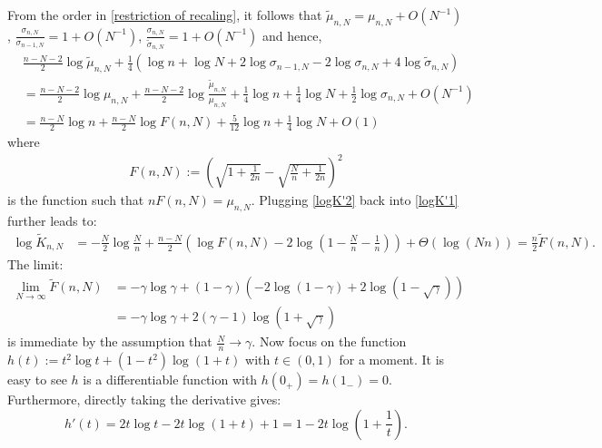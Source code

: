\documentclass[11pt]{article}
\numberwithin{equation}{section}%
\numberwithin{theorem}{section}
\begin{document}
From the order in \eqref{restriction of recaling}, it follows that $\tilde{\mu}_{n,N}=\mu_{n,N}+O(N^{-1})$, $\frac{\sigma_{n,N}}{\sigma_{n-1,N}}=1+O\left(N^{-1}\right)$, $\frac{\sigma_{n,N}}{\tilde\sigma_{n,N}}=1+O\left(N^{-1}\right)$ and hence,
\begin{equation}\label{logK'2}
\begin{split}
        &\frac{n-N-2}{2}\log\tilde{\mu}_{n,N}+\frac{1}{4}\left(\log n+\log N+2\log\sigma_{n-1,N}-2\log\sigma_{n,N}+4\log\tilde{\sigma}_{n,N}\right)\\
        &=\frac{n-N-2}{2}\log \mu_{n,N}+\frac{n-N-2}{2}\log\frac{\tilde{\mu}_{n,N}}{\mu_{n,N}}+\frac{1}{4}\log n+\frac{1}{4}\log N+\frac{1}{2}\log\sigma_{n,N}+O(N^{-1})\\
        &=\frac{n-N}{2}\log n+\frac{n-N}{2}\log F(n,N)+\frac{5}{12}\log n+\frac{1}{4}\log N+O(1)
\end{split}
\end{equation}
where 
\begin{equation*}
    \begin{array}{cc}
       F(n,N):=\left(\sqrt{1+\frac{1}{2n}}-\sqrt{\frac{N}{n}+\frac{1}{2n}}\right)^2
    \end{array}
\end{equation*}
is the function such that $nF(n,N)=\mu_{n,N}$. Plugging \eqref{logK'2} back into \eqref{logK'1} further leads to:
\begin{equation*}
    \begin{split}
     \log\tilde{K}_{n,N}&=-\frac{N}{2}\log\frac{N}{n}+\frac{n-N}{2}\left(\log F(n,N)-2\log\left(1-\frac{N}{n}-\frac{1}{n}\right)\right)+\Theta\left(\log(Nn)\right)=\frac{n}{2}\tilde{F}(n,N).
    \end{split}
\end{equation*}
The limit:
\begin{equation}\label{lim4K}
\begin{split}
  \lim_{N\rightarrow\infty}\tilde{F}(n,N)&=-\gamma\log\gamma+(1-\gamma)\left(-2\log(1-\gamma)+2\log(1-\sqrt\gamma)\right)\\
  &=-\gamma\log\gamma+2(\gamma-1)\log(1+\sqrt\gamma)
  \end{split}
\end{equation}
is immediate by the assumption that $\frac{N}{n}\rightarrow\gamma$.
Now focus on the function $h(t):=t^2\log t+(1-t^2)\log(1+t)$ with $t\in(0,1)$ for a moment. It is easy to see $h$ is a differentiable function with $h(0_+)=h(1_-)=0$. Furthermore, directly taking the derivative gives:
\begin{equation*}
    h'(t)=2t\log t-2t\log(1+t)+1=1-2t\log\left(1+\frac{1}{t}\right).
\end{equation*}
\end{document}
